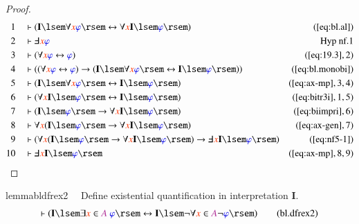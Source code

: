 \begin{proof}
\begin{align}
  1 &&  & \vdash ( \mathbf{I} \lsem \forall \msc{x} \mw{\varphi} \rsem
      \leftrightarrow \forall \msc{x} \mathbf{I} \lsem \mw{\varphi} \rsem
      )&(\mbox{\ref{eq:bl.al}})\notag
  \\ 2 &&  & \vdash \Finv \msc{x}
      \mw{\varphi}&\text{Hyp~nf.1}\notag
  \\ 3 &&  & \vdash ( \forall \msc{x} \mw{\varphi} \leftrightarrow
      \mw{\varphi} )&(\mbox{\ref{eq:19.3}},2)\notag
  \\ 4 &&  & \vdash ( ( \forall \msc{x} \mw{\varphi} \leftrightarrow
      \mw{\varphi} ) \rightarrow ( \mathbf{I} \lsem \forall \msc{x}
      \mw{\varphi} \rsem \leftrightarrow \mathbf{I} \lsem \mw{\varphi}
      \rsem ) )&(\mbox{\ref{eq:bl.monobi}})\notag
  \\ 5 &&  & \vdash ( \mathbf{I} \lsem \forall \msc{x} \mw{\varphi}
      \rsem \leftrightarrow \mathbf{I} \lsem \mw{\varphi} \rsem
      )&(\mbox{\ref{eq:ax-mp}},3,4)\notag
  \\ 6 &&  & \vdash ( \forall \msc{x} \mathbf{I} \lsem \mw{\varphi}
      \rsem \leftrightarrow \mathbf{I} \lsem \mw{\varphi} \rsem
      )&(\mbox{\ref{eq:bitr3i}},1,5)\notag
  \\ 7 &&  & \vdash ( \mathbf{I} \lsem \mw{\varphi} \rsem \rightarrow
      \forall \msc{x} \mathbf{I} \lsem \mw{\varphi} \rsem
      )&(\mbox{\ref{eq:biimpri}},6)\notag
  \\ 8 &&  & \vdash \forall \msc{x} ( \mathbf{I} \lsem \mw{\varphi}
      \rsem \rightarrow \forall \msc{x} \mathbf{I} \lsem \mw{\varphi}
      \rsem )&(\mbox{\ref{eq:ax-gen}},7)\notag
  \\ 9 &&  & \vdash ( \forall \msc{x} ( \mathbf{I} \lsem \mw{\varphi}
      \rsem \rightarrow \forall \msc{x} \mathbf{I} \lsem \mw{\varphi}
      \rsem ) \rightarrow \Finv \msc{x} \mathbf{I} \lsem \mw{\varphi}
      \rsem )&(\mbox{\ref{eq:nf5-1}})\notag
  \\ 10 &&  & \vdash \Finv \msc{x} \mathbf{I} \lsem \mw{\varphi}
      \rsem&(\mbox{\ref{eq:ax-mp}},8,9)\notag
\end{align}
\end{proof}

\begin{restatable}{lemma}{bldfrex2}~~ Define existential quantification in
interpretation $\mathbf{I}$.
\begin{align}
\vdash ( \mathbf{I} \lsem \exists \msc{x} \in \mc{A}~\mw{\varphi} \rsem
    \leftrightarrow \mathbf{I} \lsem \lnot \forall \msc{x} \in \mc{A} \lnot
    \mw{\varphi} \rsem )\label{eq:bl.dfrex2}\tag{bl.dfrex2}
\end{align}
\end{restatable}

